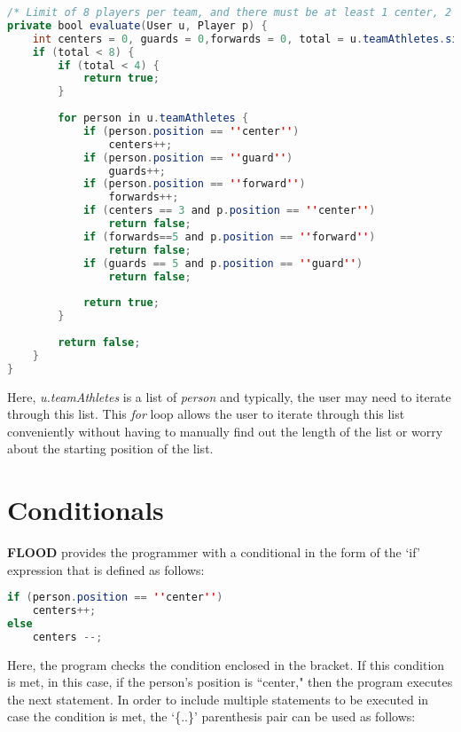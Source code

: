 \documentclass[12pt]{report}
\begin{document}
\begin{lstlisting}[language=Java,label=some-code,caption=While loop]
/* Limit of 8 players per team, and there must be at least 1 center, 2 guards and 2 forwards per team. */
private bool evaluate(User u, Player p) {
	int centers = 0, guards = 0,forwards = 0, total = u.teamAthletes.size();
	if (total < 8) {
		if (total < 4) {
			return true;
		}
		
		for person in u.teamAthletes {
			if (person.position == ''center'')
				centers++;
			if (person.position == ''guard'')
				guards++;
			if (person.position == ''forward'')
				forwards++;
			if (centers == 3 and p.position == ''center'')
				return false;
			if (forwards==5 and p.position == ''forward'')
				return false;
			if (guards == 5 and p.position == ''guard'')
				return false;
		
			return true;
		}
		
		return false;
	}
}
\end{lstlisting}

\begin{doublespace}
Here, \textit{u.teamAthletes} is a list of \textit{person} and typically, the user may need to iterate through this list. This \textit{for} loop allows the user to iterate through this list conveniently without having to manually find out the length of the list or worry about the starting position of the list.
\end{doublespace}

\section{Conditionals}

\begin{doublespace}
\textbf{FLOOD} provides the programmer with a conditional in the form of the `if' expression that is defined as follows:
\end{doublespace}

\begin{lstlisting}[language=Java,label=some-code,caption=While loop]
if (person.position == ''center'')
	centers++;
else
	centers --;
\end{lstlisting}

\begin{doublespace}
Here, the program checks the condition enclosed in the bracket. If this condition is met, in this case, if the person's position is ``center," then the program executes the next statement. In order to include multiple statements to be executed in case the condition is met, the `\{..\}'
parenthesis pair can be used as follows:
\end{doublespace}
\end{document}
